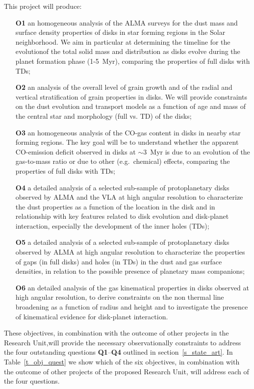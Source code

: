 \documentclass[10pt,fleqn,twoside]{article}
\begin{document}
This project will produce:
\begin{itemize}
\item[{\bf O1}] an homogeneous analysis of the ALMA surveys for the dust mass and surface density properties of disks in star forming regions in the Solar neighborhood. We aim in particular at determining the timeline for the evolutionof the total solid mass and distribution as disks evolve during the planet formation phase (1-5~Myr), comparing the properties of full disks with TDs;
\item[{\bf O2}] an analysis of the overall level of grain growth and of the radial and vertical stratification of grain properties in disks. We will provide constraints on the dust evolution and transport models as a function of age and mass of the central star and morphology (full vs. TD) of the disks;
\item[{\bf O3}] an homogeneous analysis of the CO-gas content in disks in nearby star forming regions. The key goal will be to understand whether the apparent CO-emission deficit observed in disks at $\sim$3~Myr is due to an evolution of the gas-to-mass ratio or due to other (e.g.\ chemical) effects, comparing the properties of full disks with TDs;
\item[{\bf O4}] a detailed analysis of a selected sub-sample of protoplanetary disks observed by ALMA and the VLA at high angular resolution to characterize the dust properties as a function of the location in the disk and in relationship with key features related to disk evolution and disk-planet interaction, especially the development of the inner holes (TDs);
\item[{\bf O5}] a detailed analysis of a selected sub-sample of protoplanetary disks observed by ALMA at high angular resolution to characterize the properties of gaps (in full disks) and holes (in TDs) in the dust and gas surface densities, in relation to the possible presence of planetary mass companions;
\item[{\bf O6}] an detailed analysis of the gas kinematical properties in disks observed at high angular resolution, to derive constraints on the non thermal line broadening as a function of radius and height and to investigate the presence of kinematical evidence for disk-planet interaction. 
\end{itemize}

These objectives, in combination with the outcome of other projects in the Research Unit,will provide the necessary observationally constraints to address the four outstanding questions {\bf Q1}--{\bf Q4} outlined in section~\ref{s_state_art}. In Table~\ref{t_obj_quest} we show which of the six objectives, in combination with the outcome of other projects of the proposed Research Unit, will address each of the four questions.
\end{document}
